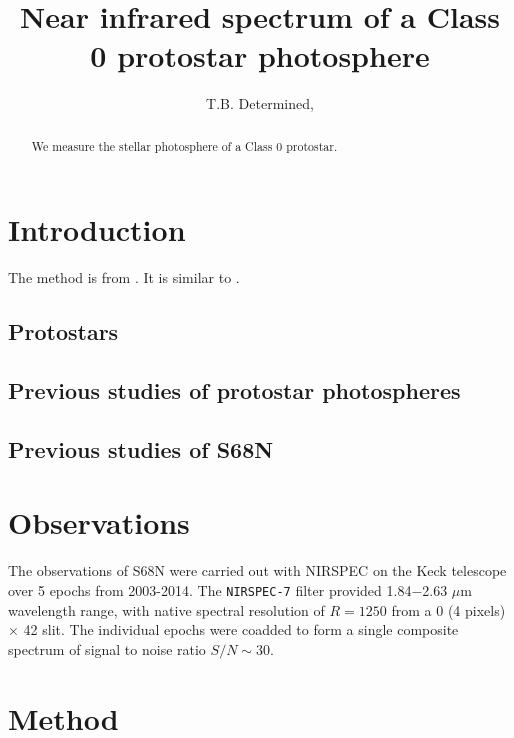 \documentclass[twocolumn]{emulateapj}%
\begin{document}
 
\title{Near infrared spectrum of a Class 0 protostar photosphere}

\author{T.B. Determined,}



\begin{abstract}
We measure the stellar photosphere of a Class 0 protostar.
\end{abstract}


\maketitle

\section{Introduction}\label{sec:intro}
The method is from \citep{czekala16}.  It is similar to \citep{2017ApJ...836..200G}.

\subsection{Protostars}
\subsection{Previous studies of protostar photospheres}
\subsection{Previous studies of S68N}


\section{Observations}
The observations of S68N were carried out with NIRSPEC on the Keck telescope over 5 epochs from 2003-2014.  The \texttt{NIRSPEC-7} filter provided 1.84$-$2.63 $\mu$m wavelength range, with native spectral resolution of $R=1250$ from a 0 (4 pixels) $\times$ 42 slit.  
The individual epochs were coadded to form a single composite spectrum of signal to noise ratio $S/N\sim30$.  

\section{Method}
\end{document}
